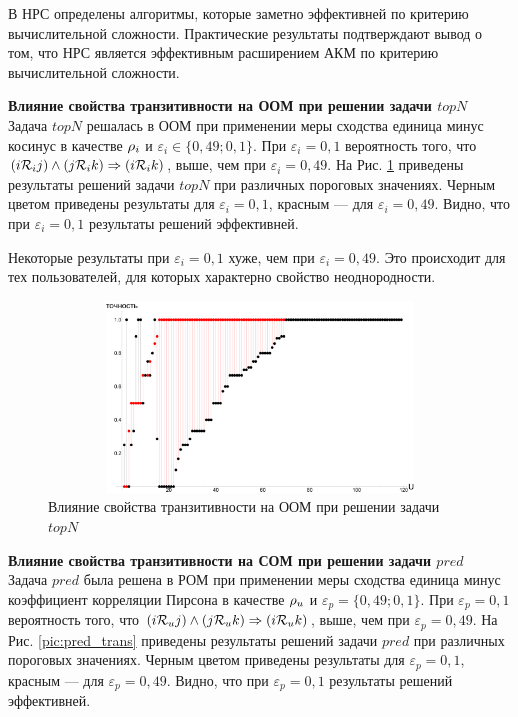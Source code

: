 В НРС определены алгоритмы, которые заметно эффективней
по критерию вычислительной сложности.
Практические результаты подтверждают вывод о том, что НРС является
эффективным расширением АКМ по критерию вычислительной сложности.

{\bf Влияние свойства транзитивности на ООМ при решении задачи $topN$} \\
Задача $topN$ решалась в ООМ при применении меры сходства единица минус косинус в качестве
$\mathcal{\rho}_i$ и $\varepsilon_i \in \{0,49; 0,1\}$.
При $\varepsilon_i = 0,1$ вероятность того, что $(i \mathcal{R}_i j) \wedge (j \mathcal{R}_i k)
\Rightarrow (i \mathcal{R}_i k)$, выше, чем при $\varepsilon_i = 0,49$.
На Рис. \ref{pic:topn_trans} приведены результаты решений задачи $topN$ при
различных пороговых значениях. Черным цветом приведены результаты для
$\varepsilon_i = 0,1$, красным --- для $\varepsilon_i = 0,49$.
Видно, что при $\varepsilon_i = 0,1$ результаты решений эффективней.

Некоторые результаты при $\varepsilon_i = 0,1$ хуже, чем при
$\varepsilon_i = 0,49$. Это происходит для тех пользователей,
для которых характерно свойство неоднородности.

\begin{figure}[H]
	\caption{Влияние свойства транзитивности на ООМ при решении задачи $topN$}
	\label{pic:topn_trans}
	\begin{center}
		\includegraphics[width=5in,height=2in]{pics/results/transitivity.pdf}
\end{center}
\end{figure}

{\bf Влияние свойства транзитивности на СОМ при решении задачи $pred$} \\
Задача $pred$ была решена в РОМ при применении меры сходства
единица минус коэффициент корреляции Пирсона в качестве $\mathcal{\rho}_u$ и
$\varepsilon_p = \{0,49; 0,1\}$.
При $\varepsilon_p = 0,1$ вероятность того, что $(i \mathcal{R}_u j) \wedge (j \mathcal{R}_u k)
\Rightarrow (i \mathcal{R}_u k)$, выше, чем при $\varepsilon_p = 0,49$.
На Рис. \ref{pic:pred_trans} приведены результаты решений задачи $pred$ при
различных пороговых значениях. Черным цветом приведены результаты для
$\varepsilon_p = 0,1$, красным --- для $\varepsilon_p = 0,49$.
Видно, что при $\varepsilon_p = 0,1$ результаты решений эффективней.

